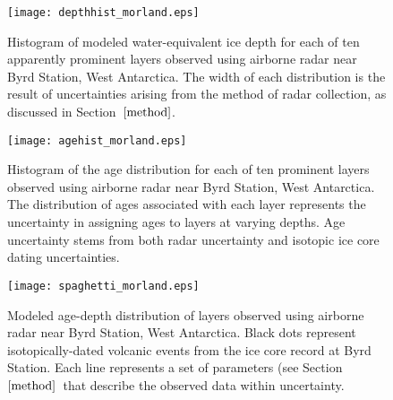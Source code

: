 \documentclass[draft,jgrga]{agutex}
\begin{document}
\begin{article}


\end{article}


\begin{figure}
\centering
	\texttt{[image: depthhist\_morland.eps]}
	\label{depthhist}
	\caption{Histogram of modeled water-equivalent ice depth for each of ten apparently prominent layers observed using airborne radar near Byrd Station, West Antarctica. The width of each distribution is the result of uncertainties arising from the method of radar collection, as discussed in Section~$\ref{method}$.}
\end{figure}

\begin{figure}
	\texttt{[image: agehist\_morland.eps]}
	\label{agehist}
	\caption{Histogram of the age distribution for each of ten prominent layers observed using airborne radar near Byrd Station, West Antarctica. The distribution of ages associated with each layer represents the uncertainty in assigning ages to layers at varying depths. Age uncertainty stems from both radar uncertainty and isotopic ice core dating uncertainties.}
\end{figure}

\begin{figure}
	\texttt{[image: spaghetti\_morland.eps]}
	\label{spaghetti}
	\caption{ Modeled age-depth distribution of layers observed using airborne radar near Byrd Station, West Antarctica. Black dots represent isotopically-dated volcanic events from the ice core record at Byrd Station. Each line represents a set of parameters (see Section~$\ref{method}$~that describe the observed data within uncertainty.    }
\end{figure}


\end{document}

